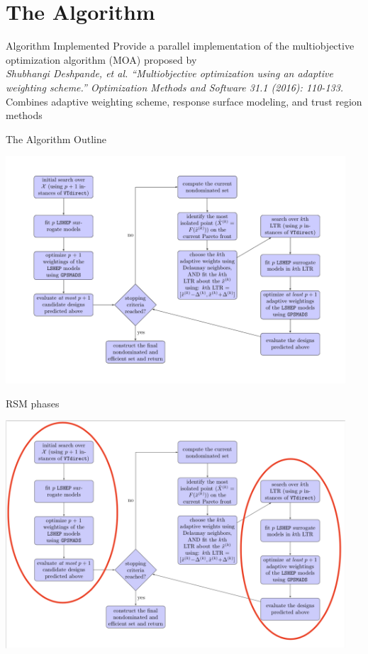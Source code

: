 \documentclass[xcolor=dvipsnames]{beamer}
\begin{document}
\section{The Algorithm}
\begin{frame}{Algorithm Implemented}
Provide a parallel implementation of the multiobjective optimization
algorithm (MOA) proposed by\\
\medskip
{ \small \it Shubhangi Deshpande, et al.
``Multiobjective optimization using an adaptive weighting scheme.''
Optimization Methods and Software 31.1 (2016): 110-133.}\\
\medskip
Combines adaptive weighting scheme, response surface modeling, and trust
region methods
\end{frame}
\begin{frame}{The Algorithm Outline}
\begin{center}
\includegraphics[width=0.95\textwidth]{algorithm-chart.pdf}
\end{center}
\end{frame}
\begin{frame}{RSM phases}
\begin{center}
\includegraphics[width=0.95\textwidth]{rsm-chart.png}
\end{center}
\end{frame}
\end{document}
